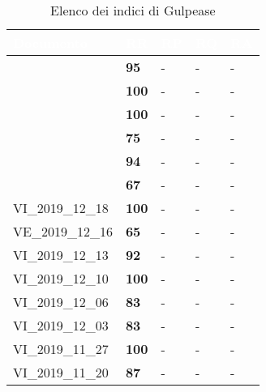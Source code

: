 {
\renewcommand{\arraystretch}{1.5}
\centering
\begin{longtable}{C{4cm} C{1cm} C{1cm} C{1cm} C{1cm}}
\caption{Elenco dei indici di Gulpease }\\
\textcolor{white}{\textbf{Documento}} & \textcolor{white}{\textbf{RR}} &
\textcolor{white}{\textbf{RP}} & \textcolor{white}{\textbf{RQ}} & 
\textcolor{white}{\textbf{RA}} \\
\hline
\endhead
{} & \textcolor{verde}{\textbf{95}} & - & - & -\\
 & \textcolor{verde}{\textbf{100}} & - & - & -\\
 & \textcolor{verde}{\textbf{100}} & - & - & - \\

 & \textcolor{giallo}{\textbf{75}} & - & - & -\\
 & \textcolor{verde}{\textbf{94}} & - & - & -\\

 & \textcolor{giallo}{\textbf{67}} & - & - & -\\

VI\_2019\_12\_18 & \textcolor{verde}{\textbf{100}} & - & - & -\\
VE\_2019\_12\_16 & \textcolor{giallo}{\textbf{65}} & - & - & -\\
VI\_2019\_12\_13 & \textcolor{verde}{\textbf{92}} & - & - & -\\
VI\_2019\_12\_10 & \textcolor{verde}{\textbf{100}} & - & - & -\\
VI\_2019\_12\_06 & \textcolor{verde}{\textbf{83}} & - & - & -\\
VI\_2019\_12\_03 & \textcolor{verde}{\textbf{83}} & - & - & -\\
VI\_2019\_11\_27 & \textcolor{verde}{\textbf{100}} & - & - & -\\
VI\_2019\_11\_20 & \textcolor{verde}{\textbf{87}} & - & - & -\\

\end{longtable}


}
